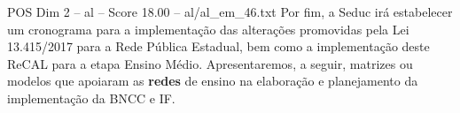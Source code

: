 \begin{textsample}{POS Dim 2 – al – Score 18.00 – al/al\_em\_46.txt}
Por fim, a Seduc irá estabelecer um cronograma para a implementação das alterações promovidas pela Lei 13.415/2017 para a Rede Pública Estadual, bem como a implementação deste ReCAL para a etapa Ensino Médio.
Apresentaremos, a seguir, matrizes ou modelos que apoiaram as \textbf{redes} de ensino na elaboração e planejamento da implementação da BNCC e IF.

\end{textsample}
